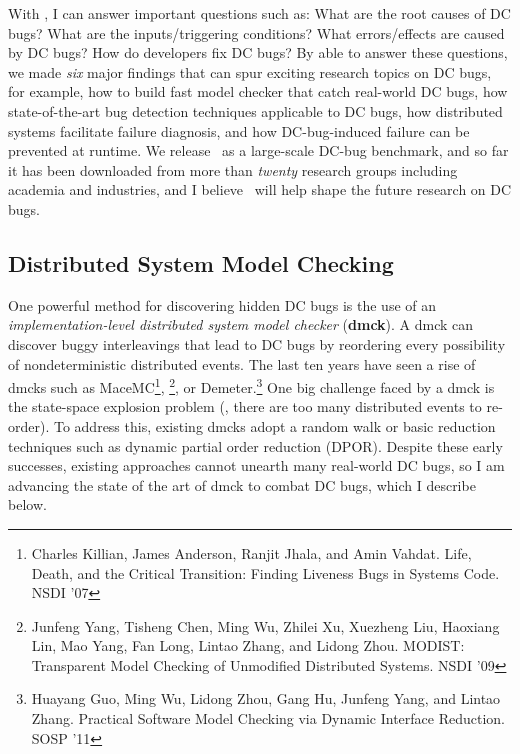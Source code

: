 \documentclass[10pt]{article}
\begin{document}
With \taxdc, I can answer important questions such as: 
%
What are the root causes of DC bugs?
%
What are the inputs/triggering conditions? 
%
What errors/effects are caused by DC bugs?
%
How do developers fix DC bugs? 
%
By able to answer these questions, we made \textit{six} major findings that can
spur exciting research topics on DC bugs, for example, how to build fast model
checker that catch real-world DC bugs, how state-of-the-art
bug detection techniques applicable to DC bugs, how distributed systems
facilitate failure diagnosis, and how DC-bug-induced failure can be prevented at
runtime.
%
We release \taxdc\ as a large-scale DC-bug benchmark, and so far it has been
downloaded from more than \textit{twenty} research groups including academia and
industries, and I believe \taxdc\ will help shape the future research on DC bugs.



\subsection{Distributed System Model Checking}

One powerful method for discovering hidden DC bugs is the use of an
\textit{implementation-level distributed system model checker} (\textbf{dmck}).
A dmck can discover buggy interleavings that lead to DC bugs by reordering
every possibility of nondeterministic distributed events. The last ten years
have seen a rise of dmcks such as 
%
MaceMC\footnote{Charles Killian, James Anderson, Ranjit Jhala,
and Amin Vahdat. Life, Death, and the Critical Transition: Finding Liveness Bugs
in Systems Code. NSDI '07}, 
%
\modist\footnote{Junfeng Yang, Tisheng Chen, Ming
Wu, Zhilei Xu, Xuezheng Liu, Haoxiang Lin, Mao Yang, Fan Long, Lintao Zhang, and
Lidong Zhou. MODIST: Transparent Model Checking of Unmodified Distributed
Systems. NSDI '09}, or Demeter.\footnote{Huayang Guo, Ming Wu, Lidong Zhou, Gang
Hu, Junfeng Yang, and Lintao Zhang. Practical Software Model Checking via
Dynamic Interface Reduction. SOSP '11} One big challenge faced by a dmck is the
state-space explosion problem (\ie, there are too many distributed events to
re-order). To address this, existing dmcks adopt a random walk or basic
reduction techniques such as dynamic partial order reduction (DPOR). Despite
these early successes, existing approaches cannot unearth many real-world DC
bugs, so I am advancing the state of the art of dmck to combat DC bugs, which I
describe below.
\end{document}
